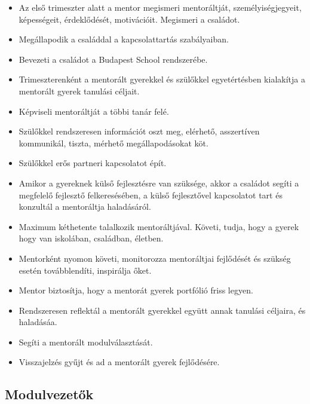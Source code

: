 \begin{itemize}
  \item
        Az első trimeszter alatt a mentor megismeri mentoráltját,
        személyiségjegyeit, képességeit, érdeklődését, motivációit. Megismeri
        a családot.
  \item
        Megállapodik a családdal a kapcsolattartás szabályaiban.
  \item
        Bevezeti a családot a Budapest School rendszerébe.
  \item
        Trimeszterenként a mentorált gyerekkel és szülőkkel egyetértésben
        kialakítja a mentorált gyerek tanulási céljait.
  \item
        Képviseli mentoráltját a többi tanár felé.
  \item
        Szülőkkel rendszeresen információt oszt meg, elérhető, asszertíven
        kommunikál, tiszta, mérhető megállapodásokat köt.
  \item
        Szülőkkel erős partneri kapcsolatot épít.
  \item
        Amikor a gyereknek külső fejlesztésre van szüksége, akkor a családot
        segíti a megfelelő fejlesztő felkeresésében, a külső fejlesztővel
        kapcsolatot tart és konzultál a mentoráltja haladásáról.
  \item
        Maximum kéthetente talalkozik mentoráltjával. Követi, tudja, hogy a
        gyerek hogy van iskolában, családban, életben.
  \item
        Mentorként nyomon követi, monitorozza mentoráltjai fejlődését és
        szükség esetén továbblendíti, inspirálja őket.
  \item
        Mentor biztosítja, hogy a mentorát gyerek portfólió friss legyen.
  \item
        Rendszeresen reflektál a mentorált gyerekkel együtt annak tanulási
        céljaira, és haladásáa.
  \item
        Segíti a mentorált modulválasztását.
  \item
        Visszajelzés gyűjt és ad a mentorált gyerek fejlődésére.
\end{itemize}

\subsection{Modulvezetők}\label{modulvezetux151k}

